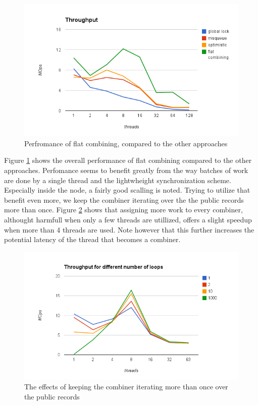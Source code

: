 \begin{figure}
 \centering
  \includegraphics[scale=0.7]{queue_fc_queue_perf.png}
\caption{Perfromance of flat combining, compared to the other approaches}
\label{queue_fc_queue_perf}
\end{figure}

Figure \ref{queue_fc_queue_perf} shows the overall performance of flat combining compared to the other approaches. Perfomance seems to benefit greatly from the way batches of work are done by a single thread and the lightwheight synchronization scheme. Especially inside the node, a fairly good scalling is noted. Trying to utilize that benefit even more, we keep the combiner iterating over the the public records more than once. Figure \ref{queue_fc_queue_loops} shows that assigning more work to every combiner, althought harmfull when only a few threads are utillized, offers a slight speedup when more than 4 threads are used. Note however that this further increases the potential latency of the thread that becomes a combiner. 


\begin{figure}
 \centering
  \includegraphics[scale=0.7]{queue_fc_queue_loops.png}
\caption{The effects of keeping the combiner iterating more than once over the public records}
\label{queue_fc_queue_loops}
\end{figure}


